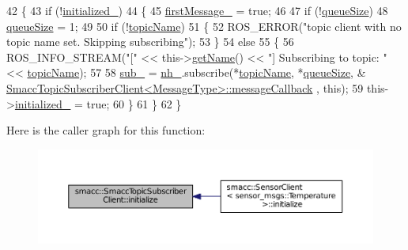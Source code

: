 \begin{DoxyCode}
42   \{
43     \textcolor{keywordflow}{if} (!\hyperlink{classsmacc_1_1SmaccTopicSubscriberClient_a12a2a96e0b93757b7eb8631da7cd6893}{initialized\_})
44     \{
45       \hyperlink{classsmacc_1_1SmaccTopicSubscriberClient_a82a44f35d08659bba1e642650296dc5d}{firstMessage\_} = \textcolor{keyword}{true};
46 
47       \textcolor{keywordflow}{if} (!\hyperlink{classsmacc_1_1SmaccTopicSubscriberClient_a1fd2ebc705ae0217ae21b23b7098cd9b}{queueSize})
48         \hyperlink{classsmacc_1_1SmaccTopicSubscriberClient_a1fd2ebc705ae0217ae21b23b7098cd9b}{queueSize} = 1;
49 
50       \textcolor{keywordflow}{if} (!\hyperlink{classsmacc_1_1SmaccTopicSubscriberClient_aa7729f37ea89e5d7ab50c81e84638f60}{topicName})
51       \{
52         ROS\_ERROR(\textcolor{stringliteral}{"topic client with no topic name set. Skipping subscribing"});
53       \}
54       \textcolor{keywordflow}{else}
55       \{
56         ROS\_INFO\_STREAM(\textcolor{stringliteral}{"["} << this->\hyperlink{classsmacc_1_1ISmaccClient_a20846aabfd1de832aa27d7a8237a1742}{getName}() << \textcolor{stringliteral}{"] Subscribing to topic: "} << 
      \hyperlink{classsmacc_1_1SmaccTopicSubscriberClient_aa7729f37ea89e5d7ab50c81e84638f60}{topicName});
57 
58         \hyperlink{classsmacc_1_1SmaccTopicSubscriberClient_aeb481004e428a5d989f39c77321427b6}{sub\_} = \hyperlink{classsmacc_1_1SmaccTopicSubscriberClient_aed36e84de0628e1a8769be5f87664b59}{nh\_}.subscribe(*\hyperlink{classsmacc_1_1SmaccTopicSubscriberClient_aa7729f37ea89e5d7ab50c81e84638f60}{topicName}, *\hyperlink{classsmacc_1_1SmaccTopicSubscriberClient_a1fd2ebc705ae0217ae21b23b7098cd9b}{queueSize}, &
      \hyperlink{classsmacc_1_1SmaccTopicSubscriberClient_a76f1850606059b39c77d181177bba442}{SmaccTopicSubscriberClient<MessageType>::messageCallback}
      , \textcolor{keyword}{this});
59         this->\hyperlink{classsmacc_1_1SmaccTopicSubscriberClient_a12a2a96e0b93757b7eb8631da7cd6893}{initialized\_} = \textcolor{keyword}{true};
60       \}
61     \}
62   \}
\end{DoxyCode}


Here is the caller graph for this function\+:
\nopagebreak
\begin{figure}[H]
\begin{center}
\leavevmode
\includegraphics[width=350pt]{classsmacc_1_1SmaccTopicSubscriberClient_af171664e207d6e86da278ea9b0d861ec_icgraph}
\end{center}
\end{figure}


